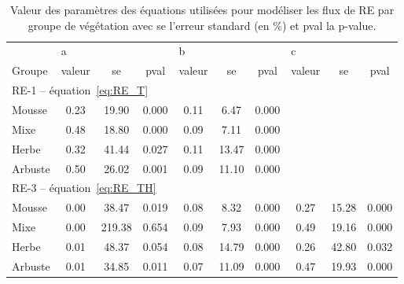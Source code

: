 \begin{table}
\centering
\caption{Valeur des paramètres des équations utilisées pour modéliser les flux de RE par groupe de végétation avec se l'erreur standard (en \si{\percent}) et pval la p-value.}
\label{table:mdl_par_grp_veg_er}
\hspace*{-1cm}
\begin{tabular}{lccccccccc}\toprule
 & \multicolumn{3}{l}{a} & \multicolumn{3}{l}{b} & \multicolumn{3}{l}{c} \\  \cmidrule(lr){2-4} \cmidrule(lr){5-7} \cmidrule(lr){8-10}
Groupe & valeur & se & pval & valeur & se & pval & valeur & se & pval \\ \midrule
\multicolumn{10}{l}{RE-1 -- équation~\ref{eq:RE_T}}  \\ [+.5ex]
Mousse  & 0.23 & 19.90 & 0.000 & 0.11 &  6.47 & 0.000 & & & \\
Mixe    & 0.48 & 18.80 & 0.000 & 0.09 &  7.11 & 0.000 & & & \\
Herbe   & 0.32 & 41.44 & 0.027 & 0.11 & 13.47 & 0.000 & & & \\
Arbuste & 0.50 & 26.02 & 0.001 & 0.09 & 11.10 & 0.000 & & & \\
\multicolumn{10}{l}{RE-3 -- équation~\ref{eq:RE_TH}}  \\ [+.5ex]
Mousse  & 0.00 &  38.47 & 0.019 & 0.08 &  8.32 & 0.000 & 0.27 & 15.28 & 0.000 \\ 
Mixe    & 0.00 & 219.38 & 0.654 & 0.09 &  7.93 & 0.000 & 0.49 & 19.16 & 0.000 \\
Herbe   & 0.01 &  48.37 & 0.054 & 0.08 & 14.79 & 0.000 & 0.26 & 42.80 & 0.032 \\
Arbuste & 0.01 &  34.85 & 0.011 & 0.07 & 11.09 & 0.000 & 0.47 & 19.93 & 0.000 \\
\bottomrule
\end{tabular}
\hspace*{-1cm}
\end{table}

